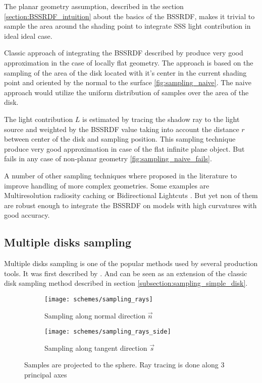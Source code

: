 The planar geometry assumption, described in the section \ref{section:BSSRDF_intuition} about the
basics of the BSSRDF, makes it trivial to sample the area around the shading point to integrate SSS
light contribution in ideal ideal case.

Classic approach of integrating the BSSRDF described by \cite{Jensen:2001:PMS:383259.383319} 
produce very good approximation in the case of locally flat geometry. The approach is based on the
sampling of the area of the disk located with it's center in the current shading point and oriented
by the normal to the surface \ref{fig:sampling_naive}. The naive approach would
utilize the uniform distribution of samples over the area of the disk.

The light contribution $L$ is estimated by tracing the shadow ray to the light source and
weighted by the BSSRDF value taking into account the distance $r$ between center of the disk and
sampling position. This sampling technique produce very good approximation in case of the flat
infinite plane object. But fails in any case of non-planar geometry
\ref{fig:sampling_naive_fails}.

A number of other sampling techniques where proposed in the literature to improve handling of more
complex geometries. Some examples are Multiresolution radiosity caching
\cite{Christensen:2012:MRC:2343045.2343108} or Bidirectional Lightcuts
\cite{Walter:2012:BL:2185520.2185555}. But yet non of them are robust enough to integrate the BSSRDF
on models with high curvatures with good accuracy.

\subsection{Multiple disks sampling}
Multiple disks sampling is one of the popular methods used by several production tools. It was first
described by \cite{King:2013:BIS:2504459.2504520}. And can be seen as an extension of the classic
disk sampling method described in section \ref{subsection:sampling_simple_disk}.
\begin{figure}[h]
    \centering
    \begin{subfigure}{0.45\textwidth}
        \texttt{[image: schemes/sampling\_rays]}
        \caption{Sampling along normal direction $\vec{n}$}
        \label{fig:sampling_rays_n}
    \end{subfigure}
    \quad
    \begin{subfigure}{0.45\textwidth}
        \texttt{[image: schemes/sampling\_rays\_side]}
        \caption{Sampling along tangent direction $\vec{s}$}
    \end{subfigure}
    \caption{Samples are projected to the sphere. Ray tracing is done along 3 principal axes}
    \label{fig:sampling_rays}
\end{figure}

